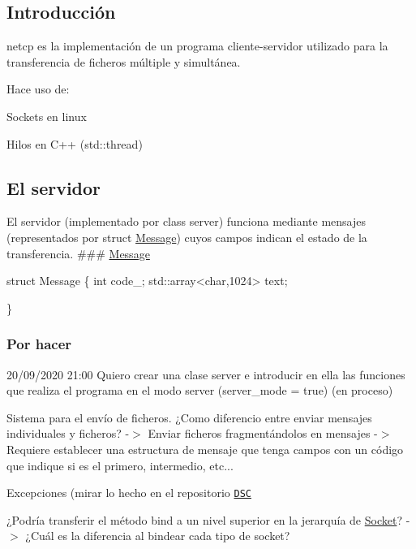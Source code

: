 \subsection*{Introducción}

{\ttfamily netcp} es la implementación de un programa cliente-\/servidor utilizado para la transferencia de ficheros múltiple y simultánea.

Hace uso de\+:
\begin{DoxyItemize}
\item Sockets en linux
\item Hilos en C++ ({\ttfamily std\+::thread})
\end{DoxyItemize}

\subsection*{El servidor}

El servidor (implementado por {\ttfamily class server}) funciona mediante mensajes (representados por {\ttfamily struct \hyperlink{structMessage}{Message}}) cuyos campos indican el estado de la transferencia. \#\#\# \hyperlink{structMessage}{Message} 
\begin{DoxyCode}
struct Message \{
  int code\_;
  std::array<char,1024> text;

\}
\end{DoxyCode}


\subsubsection*{Por hacer}


\begin{DoxyItemize}
\item 20/09/2020 21\+:00 Quiero crear una clase server e introducir en ella las funciones que realiza el programa en el modo server (server\+\_\+mode = true) (en proceso)
\item Sistema para el envío de ficheros. ¿\+Como diferencio entre enviar mensajes individuales y ficheros? -\/$>$ Enviar ficheros fragmentándolos en mensajes -\/$>$ Requiere establecer una estructura de mensaje que tenga campos con un código que indique si es el primero, intermedio, etc...
\item Excepciones (mirar lo hecho en el repositorio \href{https://github.com/miguel-martinr/Data-Structure-Classes}{\tt D\+SC}
\item ¿\+Podría transferir el método bind a un nivel superior en la jerarquía de \hyperlink{classSocket}{Socket}? -\/$>$ ¿\+Cuál es la diferencia al bindear cada tipo de socket?
\end{DoxyItemize}

